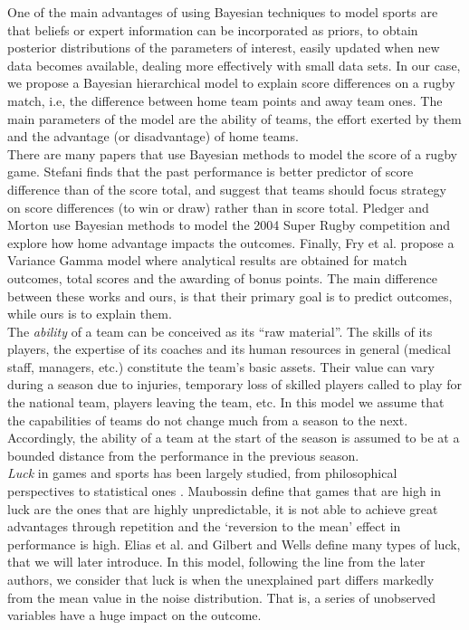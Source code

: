 \documentclass[]{article}
\begin{document}
One of the main advantages of using Bayesian techniques to model sports are that beliefs or expert information can be incorporated as priors, to obtain posterior distributions of the parameters of interest, easily updated when new data becomes available, dealing more effectively with small data sets. In our case, we propose a Bayesian hierarchical model to explain score differences on a rugby match, i.e, the difference between home team points and away team ones. The main parameters of the model are the ability of teams, the effort exerted by them and the advantage (or disadvantage) of home teams.\\

There are many papers that use Bayesian methods to model the score of a rugby game. Stefani \cite{stefani2009predicting} finds that the past performance is better predictor of score difference than of the score total, and suggest that teams should focus strategy on score differences (to win or draw) rather than in score total. Pledger and Morton \cite{pledger2011modelling} use Bayesian methods to model the 2004 Super Rugby competition and explore how home advantage impacts the outcomes. Finally, Fry et al. \cite{fry2021variance} propose a Variance Gamma model where analytical results are obtained for match outcomes, total scores and the awarding of bonus points. The main difference between these works and ours, is that their primary goal is to predict outcomes, while ours is to explain them.\\

The \textit{ability} of a team can be conceived as its ``raw material''. The skills of its players, the expertise of its coaches and its human resources in general (medical staff, managers, etc.) constitute the team's basic assets. Their value can vary during a season due to injuries, temporary loss of skilled players called to play for the national team, players leaving the team, etc. In this model we assume that the capabilities of teams do not change much from a season to the next. Accordingly, the ability of a team at the start of the season is assumed to be at a bounded distance from the performance in the previous season.\\

\textit{Luck} in games and sports has been largely studied, from philosophical perspectives \cite{simon2007deserving,morris2015moral} to statistical ones \cite{denrell2012top,pluchino2018talent}. Maubossin \cite{mauboussin2012success} define that games that are high in luck are the ones that are highly unpredictable, it is not able to achieve great advantages through repetition and the `reversion to the mean' effect in performance is high. Elias et al. \cite{elias2012characteristics} and Gilbert and Wells \cite{gilbert2019ludometrics} define many types of luck, that we will later introduce. In this model, following the line from the later authors, we consider that luck is when the unexplained part differs markedly from the mean value in the noise distribution. That is, a series of unobserved variables have a huge impact on the outcome. \\
\end{document}
